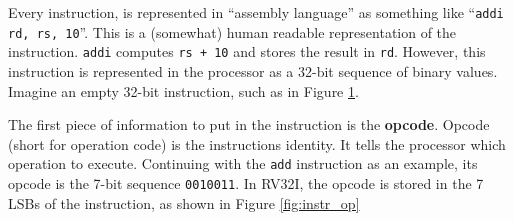 Every instruction, is represented in ``assembly language'' as something like ``\texttt{addi rd, rs, 10}''. This is a (somewhat) human readable representation of the instruction. \texttt{addi} computes \texttt{rs + 10} and stores the result in \texttt{rd}. However, this instruction is represented in the processor as a 32-bit sequence of binary values. Imagine an empty 32-bit instruction, such as in Figure \ref{fig:instr_blank}.

        \begin{figure}[H]
        \begin{center}
        \label{fig:instr_blank}
        \end{center}
        \end{figure}

The first piece of information to put in the instruction is the \textbf{opcode}. Opcode (short for operation code) is the instructions identity. It tells the processor which operation to execute. Continuing with the \texttt{add} instruction as an example, its opcode is the 7-bit sequence \texttt{0010011}. In RV32I, the opcode is stored in the 7 \glspl{LSB} of the instruction, as shown in Figure \ref{fig:instr_op}

